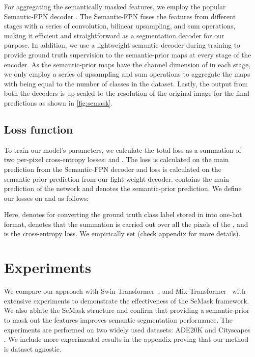 \documentclass[10pt,twocolumn,letterpaper]{article}
\begin{document}
For aggregating the semantically masked features, we employ the popular Semantic-FPN decoder \cite{sem-fpn}. The Semantic-FPN fuses the features from different stages with a series of convolution, bilinear upsampling, and sum operations, making it efficient and straightforward as a segmentation decoder for our purpose.
In addition, we use a lightweight semantic decoder during training to provide ground truth supervision to the semantic-prior maps at every stage of the encoder. As the semantic-prior maps have the channel dimension of  in each stage, we only employ a series of upsampling and sum operations to aggregate the maps with  being equal to the number of classes in the dataset. Lastly, the output from both the decoders is up-scaled  to the resolution of the original image for the final predictions as shown in \cref{fig:semask}.



\subsection{Loss function}
To train our model's parameters, we calculate the total loss  as a summation of two per-pixel cross-entropy losses:  and . The loss  is calculated on the main prediction from the Semantic-FPN decoder and loss  is calculated on the semantic-prior prediction from our light-weight decoder.  contains the main prediction of the network and  denotes the semantic-prior prediction. We define our losses on  and  as follows: 






Here,   denotes for converting the ground truth class label stored in  into one-hot format,  denotes that the summation is carried out over all the pixels of the , and  is the cross-entropy loss. We empirically set  (check appendix for more details). \section{Experiments}
\label{sec:experiments}

We compare our approach with Swin Transformer~\cite{swin-T}, and Mix-Transformer~\cite{segformer} with extensive experiments to demonstrate the effectiveness of the SeMask framework. We also ablate the SeMask structure and confirm that providing a semantic-prior to mask out the features improves semantic segmentation performance. The experiments are performed on two widely used datasets: ADE20K \cite{ade20k} and Cityscapes \cite{cityscapes}. We include more experimental results in the appendix proving that our method is dataset agnostic.
\end{document}
